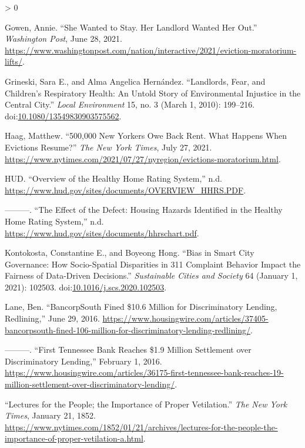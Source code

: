 \documentclass[
  openany]{book}
\newlength{\cslhangindent}
\newenvironment{CSLReferences}[2] %
 {%
  \setlength{\parindent}{0pt}
  \ifodd #1 \everypar{\setlength{\hangindent}{\cslhangindent}}\ignorespaces\fi
  \ifnum #2 > 0
  \setlength{\parskip}{#2\baselineskip}
  \fi
 }%
 {}
\begin{document}
\begin{CSLReferences}{1}{0}
\leavevmode\hypertarget{ref-gowen2021}{}%
Gowen, Annie. {``She Wanted to Stay. Her Landlord Wanted Her Out.''} \emph{Washington Post}, June 28, 2021. \url{https://www.washingtonpost.com/nation/interactive/2021/eviction-moratorium-lifts/}.

\leavevmode\hypertarget{ref-grineski2010}{}%
Grineski, Sara E., and Alma Angelica Hernández. {``Landlords, Fear, and Children's Respiratory Health: An Untold Story of Environmental Injustice in the Central City.''} \emph{Local Environment} 15, no. 3 (March 1, 2010): 199--216. doi:\href{https://doi.org/10.1080/13549830903575562}{10.1080/13549830903575562}.

\leavevmode\hypertarget{ref-haag2021}{}%
Haag, Matthew. {``500,000 New Yorkers Owe Back Rent. What Happens When Evictions Resume?''} \emph{The New York Times}, July 27, 2021. \url{https://www.nytimes.com/2021/07/27/nyregion/evictions-moratorium.html}.

\leavevmode\hypertarget{ref-HHRSover}{}%
HUD. {``Overview of the Healthy Home Rating System,''} n.d. \url{https://www.hud.gov/sites/documents/OVERVIEW_HHRS.PDF}.

\leavevmode\hypertarget{ref-HHRSlst}{}%
---------. {``The Effect of the Defect: Housing Hazards Identified in the Healthy Home Rating System,''} n.d. \url{https://www.hud.gov/sites/documents/hhrschart.pdf}.

\leavevmode\hypertarget{ref-kontokosta2021}{}%
Kontokosta, Constantine E., and Boyeong Hong. {``Bias in Smart City Governance: How Socio-Spatial Disparities in 311 Complaint Behavior Impact the Fairness of Data-Driven Decisions.''} \emph{Sustainable Cities and Society} 64 (January 1, 2021): 102503. doi:\href{https://doi.org/10.1016/j.scs.2020.102503}{10.1016/j.scs.2020.102503}.

\leavevmode\hypertarget{ref-lane2016a}{}%
Lane, Ben. {``BancorpSouth Fined {\$}10.6 Million for Discriminatory Lending, Redlining,''} June 29, 2016. \url{https://www.housingwire.com/articles/37405-bancorpsouth-fined-106-million-for-discriminatory-lending-redlining/}.

\leavevmode\hypertarget{ref-lane2016}{}%
---------. {``First Tennessee Bank Reaches {\$}1.9 Million Settlement over Discriminatory Lending,''} February 1, 2016. \url{https://www.housingwire.com/articles/36175-first-tennessee-bank-reaches-19-million-settlement-over-discriminatory-lending/}.

\leavevmode\hypertarget{ref-lectures1852}{}%
{``Lectures for the People; the Importance of Proper Vetilation.''} \emph{The New York Times}, January 21, 1852. \url{https://www.nytimes.com/1852/01/21/archives/lectures-for-the-people-the-importance-of-proper-vetilation-a.html}.


\end{CSLReferences}
\end{document}

